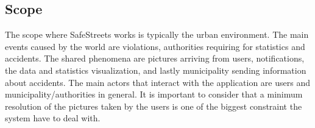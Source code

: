 \subsection{Scope}
The scope where SafeStreets works is typically the urban environment. The main events caused by the world are violations, authorities requiring for statistics and accidents.
The shared phenomena are pictures arriving from users, notifications, the data and statistics visualization, and lastly municipality sending information about accidents.  
The main actors that interact with the application are users and municipality/authorities in general.
It is important to consider that a minimum resolution of the pictures taken by the users is one of the biggest constraint the system have to deal with.
